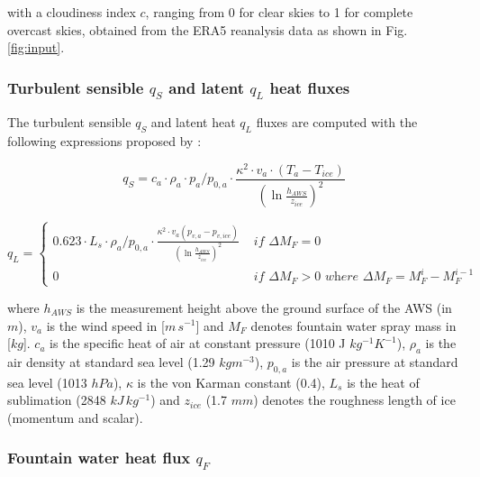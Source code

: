 \documentclass[utf8]{frontiersSCNS} %
\begin{document}
with a cloudiness index $c$, ranging from 0 for clear skies to 1 for complete
overcast skies, obtained from the ERA5 reanalysis data as shown in Fig.
\ref{fig:input}.

\subsubsection{Turbulent sensible $q_{S}$ and latent $q_{L}$ heat fluxes }

The turbulent sensible $q_{S}$ and latent heat $q_{L}$ fluxes are computed
with the following expressions proposed by \cite{Garratt_1992}:

\begin{equation} q_{S}=c_{a} \cdot \rho_{a} \cdot p_{a}/p_{0,a} \cdot
\frac{\kappa^2 \cdot v_a \cdot
(T_a-T_{ice})}{{(\ln{\frac{h_{AWS}}{z_{ice}}})}^2} \label{eqn:qs}
\end{equation}

\begin{equation}
  q_{L} = \left\{ \begin{array}{ll}
        
         0.623 \cdot L_s \cdot \rho_{a}/p_{0,a} \cdot \frac{\kappa^2 \cdot
         v_a(p_{v,a}-p_{v,ice})}{{(\ln{\frac{h_{AWS}}{z_{ice}}})}^2} &
         \textit{ if } \Delta M_{F} = 0\\ 0 & \textit{ if } \Delta M_{F} > 0
         \textit{ where } \Delta M_{F} = M_{F}^{i} - M_{F}^{i-1}
         
    \end{array} \right.
\label{eqn:ql}
\end{equation}

where $h_{AWS}$ is the measurement height above the ground surface of the AWS
(in $m$), $v_a$ is the wind speed in [$m\,s^{-1}$] and $M_{F}$ denotes fountain
water spray mass in [$kg$]. $c_a$ is the specific heat of air at constant
pressure (1010 J $kg^{-1} K^{-1}$), $\rho_{a}$ is the air density at standard
sea level (1.29 $kg m^{-3}$), $p_{0,a}$ is the air pressure at standard sea
level (1013 $hPa$), $\kappa$ is the von Karman constant (0.4), $L_s$ is the heat
of sublimation (2848 $kJ\, kg^{-1}$) and $z_{ice}$ (1.7 $mm$) denotes the
roughness length of ice (momentum and scalar).


\subsubsection{Fountain water heat flux $q_{F}$ }
\end{document}
